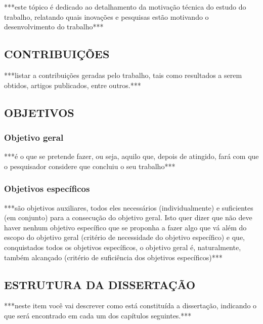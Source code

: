 ***este tópico é dedicado ao detalhamento da motivação técnica do estudo do trabalho, relatando quais inovações e pesquisas estão motivando o desenvolvimento do trabalho***


\subsection{CONTRIBUIÇÕES}

***listar a contribuições geradas pelo trabalho, tais como resultados a serem obtidos, artigos publicados, entre outros.***

\subsection{OBJETIVOS}

\subsubsection{Objetivo geral}

***é o que se pretende fazer, ou seja, aquilo que, depois de atingido, fará com que o pesquisador considere que concluiu o seu trabalho***

\subsubsection{Objetivos específicos}

***são objetivos auxiliares, todos eles necessários (individualmente) e suficientes (em conjunto) para a consecução do objetivo geral. Isto quer dizer que não deve haver nenhum objetivo específico que se proponha a fazer algo que vá além do escopo do objetivo geral (critério de necessidade do objetivo específico) e que, conquistados todos os objetivos específicos, o objetivo geral é, naturalmente, também alcançado (critério de suficiência dos objetivos específicos)***

\subsection{ESTRUTURA DA DISSERTAÇÃO}

***neste item você vai descrever como está constituída a dissertação, indicando o que será encontrado em cada um dos capítulos seguintes.***